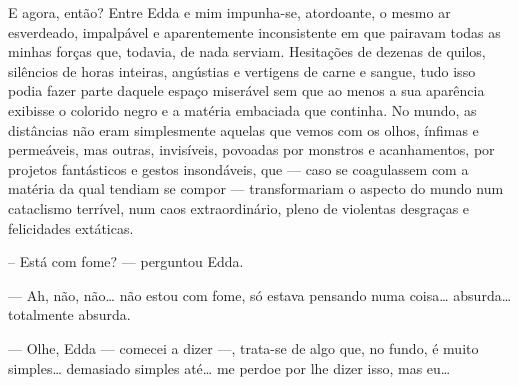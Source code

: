 E agora, então? Entre Edda e mim impunha-se, atordoante, o mesmo ar
esverdeado, impalpável e aparentemente inconsistente em que pairavam todas as
minhas forças que, todavia, de nada serviam. Hesitações de dezenas de quilos,
silêncios de horas inteiras, angústias e vertigens de carne e sangue, tudo
isso podia fazer parte daquele espaço miserável sem que ao menos a sua
aparência exibisse o colorido negro e a matéria embaciada que continha. No
mundo, as distâncias não eram simplesmente aquelas que vemos com os olhos,
ínfimas e permeáveis, mas outras, invisíveis, povoadas por monstros e
acanhamentos, por projetos fantásticos e gestos insondáveis, que --- caso se
coagulassem com a matéria da qual tendiam se compor --- transformariam o
aspecto do mundo num cataclismo terrível, num caos extraordinário, pleno de
violentas desgraças e felicidades extáticas.



-- Está com fome? --- perguntou Edda.

--- Ah, não, não\ldots{} não estou com fome, só estava pensando numa
    coisa\ldots{} absurda\ldots{} totalmente absurda.


--- Olhe, Edda --- comecei a dizer ---, trata-se de algo que, no fundo, é muito
    simples\ldots{} demasiado simples até\ldots{} me perdoe por lhe dizer
    isso, mas eu\ldots{}

